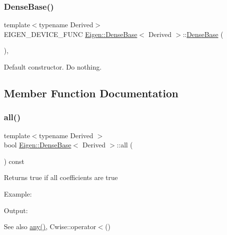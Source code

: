 \subsubsection{\texorpdfstring{DenseBase()}{DenseBase()}}
{\footnotesize\ttfamily template$<$typename Derived$>$ \\
E\+I\+G\+E\+N\+\_\+\+D\+E\+V\+I\+C\+E\+\_\+\+F\+U\+NC \mbox{\hyperlink{class_eigen_1_1_dense_base}{Eigen\+::\+Dense\+Base}}$<$ Derived $>$\+::\mbox{\hyperlink{class_eigen_1_1_dense_base}{Dense\+Base}} (\begin{DoxyParamCaption}{ }\end{DoxyParamCaption})\hspace{0.3cm}{\ttfamily [inline]}, {\ttfamily [protected]}}

Default constructor. Do nothing. 

\subsection{Member Function Documentation}
\mbox{\label{class_eigen_1_1_dense_base_ae42ab60296c120e9f45ce3b44e1761a4}} 
\subsubsection{\texorpdfstring{all()}{all()}}
{\footnotesize\ttfamily template$<$typename Derived $>$ \\
bool \mbox{\hyperlink{class_eigen_1_1_dense_base}{Eigen\+::\+Dense\+Base}}$<$ Derived $>$\+::all (\begin{DoxyParamCaption}{ }\end{DoxyParamCaption}) const\hspace{0.3cm}{\ttfamily [inline]}}

\begin{DoxyReturn}{Returns}
true if all coefficients are true
\end{DoxyReturn}
Example\+: 
\begin{DoxyCodeInclude}{0}
\end{DoxyCodeInclude}
 Output\+: 
\begin{DoxyVerbInclude}
\end{DoxyVerbInclude}


\begin{DoxySeeAlso}{See also}
\mbox{\hyperlink{class_eigen_1_1_dense_base_abfbf4cb72dd577e62fbe035b1c53e695}{any()}}, Cwise\+::operator$<$() 
\end{DoxySeeAlso}
\mbox{\label{class_eigen_1_1_dense_base_af1e669fd3aaae50a4870dc1b8f3b8884}} 
